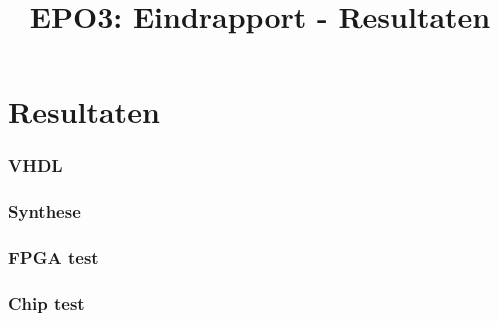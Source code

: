 \documentclass{scrartcl} %
\author{}
\title{EPO3: Eindrapport - Resultaten}
\begin{document}
\chapter{Resultaten}
\label{ch:resultaten}

\subsection{VHDL}



\subsection{Synthese}



\subsection{FPGA test}



\subsection{Chip test}
\end{document}
